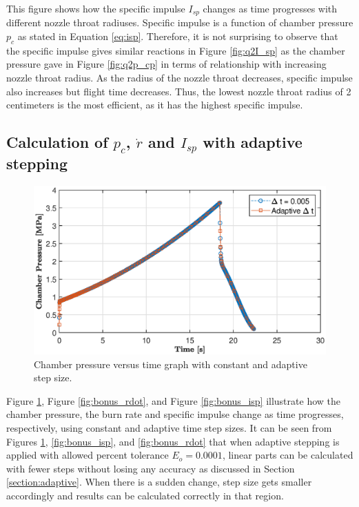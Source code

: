 \documentclass[letterpaper,12pt]{article}
\begin{document}
This figure shows how the specific impulse $I_{sp}$ changes as time progresses with different nozzle throat radiuses.
Specific impulse is a function of chamber pressure $p_c$ as stated in Equation \ref{eq:isp}. 
Therefore, it is not surprising to observe that the specific impulse gives similar reactions in Figure \ref{fig:q2I_sp} 
as the chamber pressure gave in Figure \ref{fig:q2p_cp} in terms of relationship with increasing nozzle throat radius. 
As the radius of the nozzle throat decreases, specific impulse also increases but flight time decreases. Thus, the 
lowest nozzle throat radius of 2 centimeters is the most efficient, as it has the highest specific impulse.

\newpage
\subsection{Calculation of $p_c$, $\dot{r}$ and $I_{sp}$ with adaptive stepping}

\begin{figure}[!h]
	\centering
	\includegraphics[height = 8.5 cm]{graphs/bonus_pc.eps}
	\caption{Chamber pressure versus time graph with constant and adaptive step size.}
	\label{fig:bonus_cp}
\end{figure}

Figure \ref{fig:bonus_cp}, Figure \ref{fig:bonus_rdot}, and Figure \ref{fig:bonus_isp} illustrate how the chamber pressure, 
the burn rate and specific impulse change as time progresses, respectively, using constant and adaptive time step sizes.
It can be seen from Figures \ref{fig:bonus_cp}, \ref{fig:bonus_isp}, and \ref{fig:bonus_rdot} that when adaptive stepping is 
applied with allowed percent tolerance $E_o = 0.0001$, linear parts can be calculated with fewer steps without losing any accuracy as discussed in 
Section \ref{section:adaptive}. When there is a sudden change, step size gets smaller accordingly and results can be calculated correctly in that region.
\end{document}
